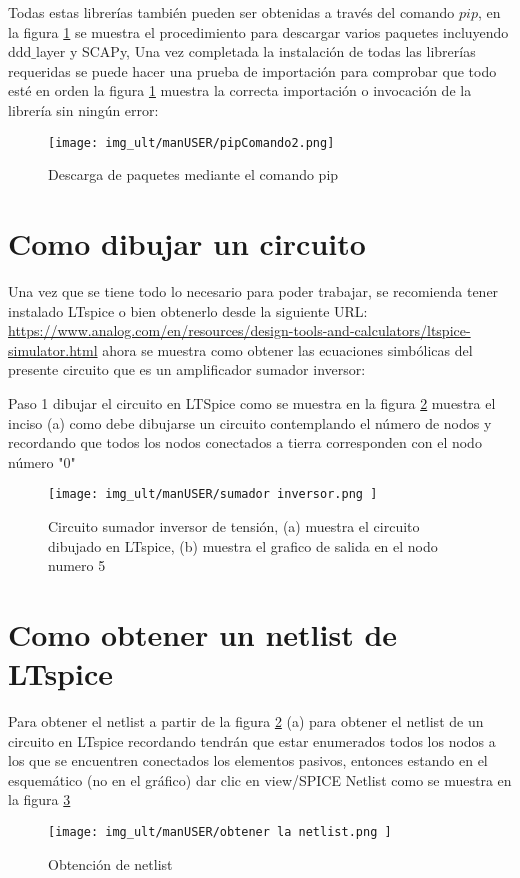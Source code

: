 Todas estas librerías también pueden ser obtenidas a través del comando $pip$, en la figura \ref{img:pip install} se muestra el procedimiento para descargar varios paquetes incluyendo ddd$\_$layer y SCAPy, Una vez completada la instalación de todas las librerías requeridas se puede hacer una prueba de importación para comprobar que todo esté en orden la figura \ref{img:pip install} muestra la correcta importación o invocación de la librería sin ningún error:


\begin{figure}[H]
	\centering\texttt{[image: img\_ult/manUSER/pipComando2.png]}
	\caption{Descarga de paquetes mediante el comando pip}
	\label{img:pip install}
\end{figure} 

\section{Como dibujar un circuito}
Una vez que se tiene todo lo necesario para poder trabajar, se recomienda tener instalado LTspice o bien obtenerlo desde la siguiente URL: \url{https://www.analog.com/en/resources/design-tools-and-calculators/ltspice-simulator.html} ahora se muestra como obtener las ecuaciones simbólicas del presente circuito que es un amplificador sumador inversor:\par 
Paso 1 dibujar el circuito en LTSpice como se muestra en la figura \ref{img:sumador inversor} muestra el inciso (a) como debe dibujarse un circuito contemplando el número de nodos y recordando que todos los nodos conectados a tierra corresponden con el nodo número "0" 

\begin{figure}[H]
	\centering\texttt{[image: img\_ult/manUSER/sumador inversor.png
	]}
	\caption{Circuito sumador inversor de tensión, (a) muestra el circuito dibujado en LTspice, (b) muestra el grafico de salida en el nodo numero 5}
	\label{img:sumador inversor}
\end{figure} 

\section{Como obtener un netlist de LTspice} Para obtener el netlist a partir de la figura \ref{img:sumador inversor} (a) 
para obtener el netlist de un circuito en LTspice recordando tendrán que estar enumerados todos los nodos a los que se encuentren conectados los elementos pasivos, entonces estando en el esquemático (no en el gráfico) dar clic en view/SPICE Netlist como se muestra en la figura \ref{img:obtener la netlist}
\begin{figure}[H]
	\centering\texttt{[image: img\_ult/manUSER/obtener la netlist.png
	]}
	\caption{Obtención de netlist}
	\label{img:obtener la netlist}
\end{figure} 

